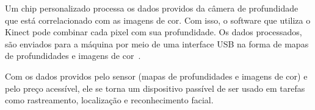 Um chip personalizado processa os dados providos da câmera de profundidade que está correlacionado com as imagens de cor. Com isso, o software que utiliza o Kinect pode combinar cada pixel com sua profundidade. Os dados processados, são enviados para a máquina por meio de uma interface USB na forma de mapas de profundidades e imagens de cor~\cite{kinect}.

Com os dados providos pelo sensor (mapas de profundidades e imagens de cor) e pelo preço acessível, ele se torna um dispositivo passível de ser usado em tarefas como rastreamento, localização e reconhecimento facial.
